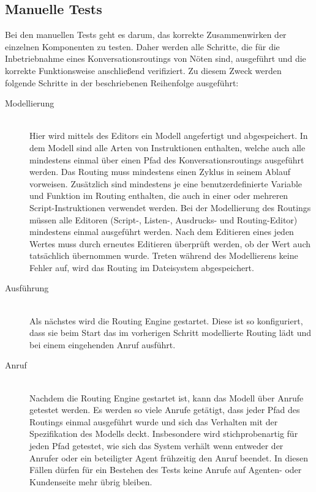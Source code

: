\subsection{Manuelle Tests}
Bei den manuellen Tests geht es darum, das korrekte Zusammenwirken der einzelnen Komponenten zu testen. Daher werden alle Schritte, die für die Inbetriebnahme eines Konversationsroutings von Nöten sind, ausgeführt und die korrekte Funktionsweise anschließend verifiziert. Zu diesem Zweck werden folgende Schritte in der beschriebenen Reihenfolge ausgeführt:
\begin{description}
\item[Modellierung] \hfill \\
Hier wird mittels des Editors ein Modell angefertigt und abgespeichert. In dem Modell sind alle Arten von Instruktionen enthalten, welche auch alle mindestens einmal über einen Pfad des Konversationsroutings ausgeführt werden. Das Routing muss mindestens einen Zyklus in seinem Ablauf vorweisen. Zusätzlich sind mindestens je eine benutzerdefinierte Variable und Funktion im Routing enthalten, die auch in einer oder mehreren Script-Instruktionen verwendet werden. Bei der Modellierung des Routings müssen alle Editoren (Script-, Listen-, Ausdrucks- und Routing-Editor) mindestens einmal ausgeführt werden. Nach dem Editieren eines jeden Wertes muss durch erneutes Editieren überprüft werden, ob der Wert auch tatsächlich übernommen wurde. Treten während des Modellierens keine Fehler auf, wird das Routing im Dateisystem abgespeichert. 
\item[Ausführung] \hfill \\
Als nächstes wird die Routing Engine gestartet. Diese ist so konfiguriert, dass sie beim Start das im vorherigen Schritt modellierte Routing lädt und bei einem eingehenden Anruf ausführt.
\item[Anruf] \hfill \\
Nachdem die Routing Engine gestartet ist, kann das Modell über Anrufe getestet werden. Es werden so viele Anrufe getätigt, dass jeder Pfad des Routings einmal ausgeführt wurde und sich das Verhalten mit der Spezifikation des Modells deckt. Insbesondere wird stichprobenartig für jeden Pfad getestet, wie sich das System verhält wenn entweder der Anrufer oder ein beteiligter Agent frühzeitig den Anruf beendet. In diesen Fällen dürfen für ein Bestehen des Tests keine Anrufe auf Agenten- oder Kundenseite mehr übrig bleiben.
\end{description}
